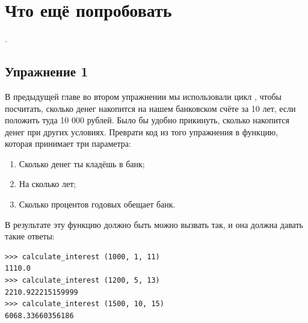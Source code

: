 
\vspace{6pt}

\section{Что ещё попробовать}

.

\subsection*{Упражнение 1}
В предыдущей главе во втором упражнении мы использовали цикл , чтобы посчитать, сколько денег накопится на нашем банковском счёте за 10 лет, если положить туда 10 000 рублей. Было бы удобно прикинуть, сколько накопится денег при других условиях. Преврати код из того упражнения в функцию, которая принимает три параметра:

\begin{enumerate}
\item Сколько денег ты кладёшь в банк;
\item На сколько лет;
\item Сколько процентов годовых обещает банк.
\end{enumerate}

В результате эту функцию должно быть можно вызвать так, и она должна давать такие ответы:

\begin{listing}
\begin{verbatim}
>>> calculate_interest (1000, 1, 11)
1110.0
>>> calculate_interest (1200, 5, 13)
2210.922215159999
>>> calculate_interest (1500, 10, 15)
6068.33660356186
\end{verbatim}
\end{listing}

